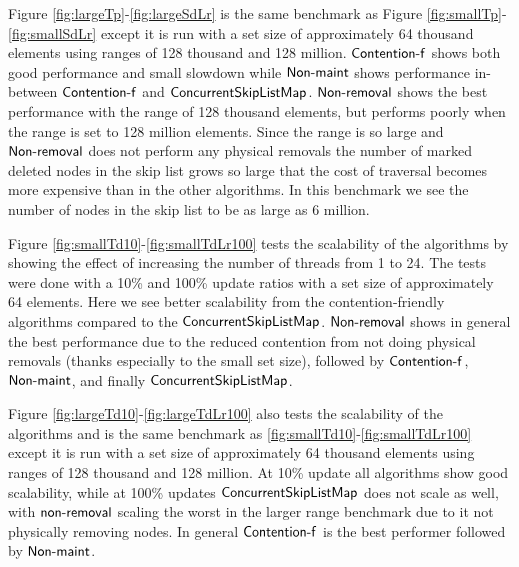 Figure \ref{fig:largeTp}-\ref{fig:largeSdLr} is the same benchmark as Figure \ref{fig:smallTp}-\ref{fig:smallSdLr} except it is run with a set size of approximately 64 thousand elements
using ranges of 128 thousand and 128 million.
$\lit{Contention-f}$ shows both good performance and small slowdown while $\lit{Non-maint}$ shows performance in-between $\lit{Contention-f}$ and
$\lit{ConcurrentSkipListMap}$.
$\lit{Non-removal}$ shows the best performance with the range of 128 thousand elements, but performs poorly when the range is set to 128 million elements.
Since the range is so large and $\lit{Non-removal}$ does not perform any physical removals the number of marked deleted nodes in the skip list grows
so large that the cost of traversal becomes more expensive than in the other algorithms.
In this benchmark we see the number of nodes in the skip list to be as large as 6 million.


Figure \ref{fig:smallTd10}-\ref{fig:smallTdLr100} tests the scalability of the algorithms by showing the effect of increasing the number of threads from 1 to 24.
The tests were done with a 10\% and 100\% update ratios with a set size of 
approximately 64 elements.
Here we see better scalability from the contention-friendly algorithms compared to the 
$\lit{ConcurrentSkipListMap}$.
$\lit{Non-removal}$ shows in general the best performance due to the reduced contention from not doing physical removals (thanks especially to the small set size),
followed by $\lit{Contention-f}$, $\lit{Non-maint}$, and finally $\lit{ConcurrentSkipListMap}$.

Figure \ref{fig:largeTd10}-\ref{fig:largeTdLr100} also tests the scalability of the algorithms and is the same benchmark as \ref{fig:smallTd10}-\ref{fig:smallTdLr100} except it is run with a set size of approximately 64 thousand elements
using ranges of 128 thousand and 128 million.
At 10\% update all algorithms show good scalability, while at 100\% updates $\lit{ConcurrentSkipListMap}$ does not scale as well, with $\lit{non-removal}$ scaling the worst in
the larger range benchmark due to it not physically removing nodes.
In general $\lit{Contention-f}$ is the best performer followed by $\lit{Non-maint}$.

